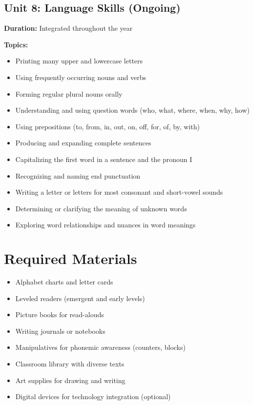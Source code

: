 \documentclass[11pt,letterpaper]{report}
\begin{document}
\subsection{Unit 8: Language Skills (Ongoing)}

\textbf{Duration:} Integrated throughout the year

\textbf{Topics:}
\begin{itemize}
    \item Printing many upper and lowercase letters
    \item Using frequently occurring nouns and verbs
    \item Forming regular plural nouns orally
    \item Understanding and using question words (who, what, where, when, why, how)
    \item Using prepositions (to, from, in, out, on, off, for, of, by, with)
    \item Producing and expanding complete sentences
    \item Capitalizing the first word in a sentence and the pronoun I
    \item Recognizing and naming end punctuation
    \item Writing a letter or letters for most consonant and short-vowel sounds
    \item Determining or clarifying the meaning of unknown words
    \item Exploring word relationships and nuances in word meanings
\end{itemize}

\section{Required Materials}

\begin{itemize}
    \item Alphabet charts and letter cards
    \item Leveled readers (emergent and early levels)
    \item Picture books for read-alouds
    \item Writing journals or notebooks
    \item Manipulatives for phonemic awareness (counters, blocks)
    \item Classroom library with diverse texts
    \item Art supplies for drawing and writing
    \item Digital devices for technology integration (optional)
\end{itemize}
\end{document}
